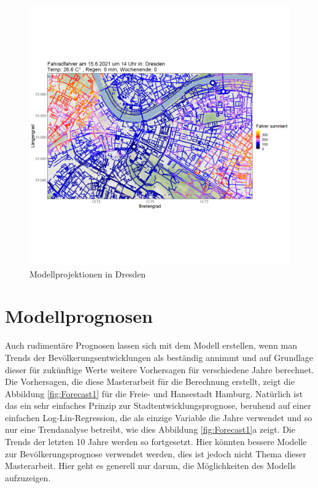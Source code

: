 \documentclass[a4paper,12pt]{thesis}
\begin{document}
\begin{figure}[!ht]
	\centering
	\includegraphics[width=\textwidth]{Plots/Dresden.png}
	\caption{Modellprojektionen in Dresden}
	\label{Dresden}
\end{figure}

\section{Modellprognosen}

Auch rudimentäre Prognosen lassen sich mit dem Modell erstellen, wenn man Trends der Bevölkerungsentwicklungen als beständig annimmt und auf Grundlage dieser für zukünftige Werte weitere Vorhersagen für verschiedene Jahre berechnet. Die Vorhersagen, die diese Masterarbeit für die Berechnung erstellt, zeigt die Abbildung \ref{fig:Forecast1} für die Freie- und Hansestadt Hamburg. Natürlich ist das ein sehr einfaches Prinzip zur Stadtentwicklungsprognose, beruhend auf einer einfachen Log-Lin-Regression, die als einzige Variable die Jahre verwendet und so nur eine Trendanalyse betreibt, wie dies Abbildung \ref{fig:Forecast1}a zeigt. Die Trends der letzten 10 Jahre werden so fortgesetzt. Hier könnten bessere Modelle zur Bevölkerungsprognose verwendet werden, dies ist jedoch nicht Thema dieser Masterarbeit. Hier geht es generell nur darum, die Möglichkeiten des Modells aufzuzeigen.
\end{document}
